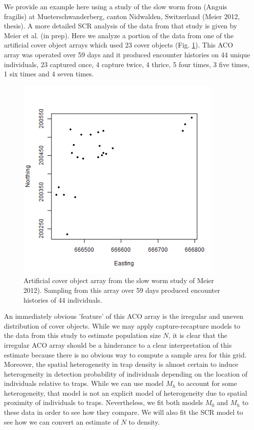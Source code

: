 \documentclass{book}
\begin{document}
We provide an example here using a study of the slow worm from (Anguis
fragilis) at Mueterschwanderberg, canton Nidwalden, Switzerland (Meier
2012, thesis). A more detailed SCR analysis of the data from that
study is given by Meier et al. (in prep). Here we analyze a portion of
the data from one of the artificial cover object arrays which used 23
cover objects (Fig. \ref{fig.fig1}). This ACO array was operated over 59 days and it
produced encounter histories on 44 unique individuals, 23 captured
once, 4 capture twice, 4 thrice, 5 four times, 3 five times, 1 six
times and 4 seven times.
\begin{figure}[h]
\centering
\includegraphics[height=4in,width=4in]{traps.png}
\caption{
Artificial cover object array from the slow worm study of Meier
2012).  Sampling from this array over 59 days produced encounter
histories of 44 individuals. 
}
\label{fig.fig1}
\end{figure}
An immediately obvious 'feature' of this ACO array is the irregular
and uneven distribution of cover objects.  While we may apply
capture-recapture models to the data from this study to estimate
population size $N$, it is clear that the irregular ACO array should
be a hinderance to a clear interpretation of this estimate because
there is no obvious way to compute a sample area for this
grid. Moreover, the spatial heterogeneity in trap density is almost
certain to induce heterogeneity in detection probability of
individuals depending on the location of individuals relative to
traps. While we can use model $M_h$ to account for some heterogeneity,
that model is not an explicit model of heterogeneity due to spatial
proximity of individuals to traps. Nevertheless, we fit both models
$M_0$ and $M_h$ to these data in order to see how they compare.  We
will also fit the SCR model to see how we can convert an estimate of
$N$ to density. 
\end{document}
